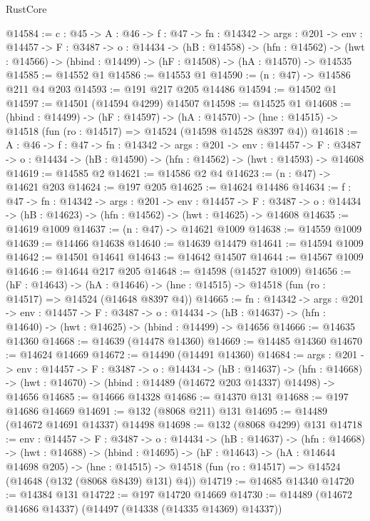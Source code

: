 \begin{lexlean}{RustCore}
\begin{coremodule}
@14584 := {c : @45} ->
  {A : @46} ->
  {f : @47} ->
  {fn : @14342} ->
  {args : @201} ->
  {env : @14457} ->
  {F : @3487} ->
  {o : @14434} ->
  (hB : @14558) ->
  (hfn : @14562) -> (hwt : @14566) -> (hbind : @14499) -> (hF : @14508) -> (hA : @14570) -> @14535
@14585 := @14552 @1
@14586 := @14553 @1
@14590 := (n : @47) -> @14586 @211 @4 @203
@14593 := @191 @217 @205 @14486
@14594 := @14502 @1
@14597 := @14501 (@14594 @4299) @14507
@14598 := @14525 @1
@14608 := (hbind : @14499) ->
  (hF : @14597) ->
  (hA : @14570) -> (hne : @14515) -> @14518 (fun (ro : @14517) => @14524 (@14598 @14528 @8397 @4))
@14618 := {A : @46} ->
  {f : @47} ->
  {fn : @14342} ->
  {args : @201} ->
  {env : @14457} ->
  {F : @3487} -> {o : @14434} -> (hB : @14590) -> (hfn : @14562) -> (hwt : @14593) -> @14608
@14619 := @14585 @2
@14621 := @14586 @2 @4
@14623 := (n : @47) -> @14621 @203
@14624 := @197 @205
@14625 := @14624 @14486
@14634 := {f : @47} ->
  {fn : @14342} ->
  {args : @201} ->
  {env : @14457} ->
  {F : @3487} -> {o : @14434} -> (hB : @14623) -> (hfn : @14562) -> (hwt : @14625) -> @14608
@14635 := @14619 @1009
@14637 := (n : @47) -> @14621 @1009
@14638 := @14559 @1009
@14639 := @14466 @14638
@14640 := @14639 @14479
@14641 := @14594 @1009
@14642 := @14501 @14641
@14643 := @14642 @14507
@14644 := @14567 @1009
@14646 := @14644 @217 @205
@14648 := @14598 (@14527 @1009)
@14656 := (hF : @14643) ->
  (hA : @14646) -> (hne : @14515) -> @14518 (fun (ro : @14517) => @14524 (@14648 @8397 @4))
@14665 := {fn : @14342} ->
  {args : @201} ->
  {env : @14457} ->
  {F : @3487} ->
  {o : @14434} -> (hB : @14637) -> (hfn : @14640) -> (hwt : @14625) -> (hbind : @14499) -> @14656
@14666 := @14635 @14360
@14668 := @14639 (@14478 @14360)
@14669 := @14485 @14360
@14670 := @14624 @14669
@14672 := @14490 (@14491 @14360)
@14684 := {args : @201} ->
  {env : @14457} ->
  {F : @3487} ->
  {o : @14434} ->
  (hB : @14637) ->
  (hfn : @14668) -> (hwt : @14670) -> (hbind : @14489 (@14672 @203 @14337) @14498) -> @14656
@14685 := @14666 @14328
@14686 := @14370 @131
@14688 := @197 @14686 @14669
@14691 := @132 (@8068 @211) @131
@14695 := @14489 (@14672 @14691 @14337) @14498
@14698 := @132 (@8068 @4299) @131
@14718 := {env : @14457} ->
  {F : @3487} ->
  {o : @14434} ->
  (hB : @14637) ->
  (hfn : @14668) ->
  (hwt : @14688) ->
  (hbind : @14695) ->
  (hF : @14643) ->
  (hA : @14644 @14698 @205) ->
  (hne : @14515) -> @14518 (fun (ro : @14517) => @14524 (@14648 (@132 (@8068 @8439) @131) @4))
@14719 := @14685 @14340
@14720 := @14384 @131
@14722 := @197 @14720 @14669
@14730 := @14489 (@14672 @14686 @14337) (@14497 (@14338 (@14335 @14369) @14337))

\end{coremodule}
\end{lexlean}
